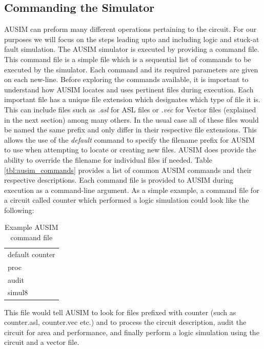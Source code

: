 \documentclass[12pt]{report}
\begin{document}
\subsection{Commanding the Simulator}
AUSIM can preform many different operations pertaining to the circuit.  For our purposes we will focus on the steps leading upto and including logic and stuck-at fault simulation.  The AUSIM simulator is executed by providing a command file.  This command file is a simple file which is a sequential list of commands to be executed by the simulator.  Each command and its required parameters are given on each new-line.  Before exploring the commands available, it is important to understand how AUSIM locates and uses pertinent files during execution.  Each important file has a unique file extension which designates which type of file it is.  This can include files such as \textit{.asl} for ASL files or \textit{.vec} for Vector files (explained in the next section) among many others.  In the usual case all of these files would be named the same prefix and only differ in their respective file extensions.  This allows the use of the \textit{default} command to specify the filename prefix for AUSIM to use when attempting to locate or creating new files.  AUSIM does provide the ability to override the filename for individual files if needed\cite{ausim}.  Table \ref{tbl:ausim_commands} provides a list of common AUSIM commands and their respective descriptions.  Each command file is provided to AUSIM during execution as a command-line argument.  As a simple example, a command file for a circuit called counter which performed a logic simulation could look like the following:
\begin{table}
	\caption{Example AUSIM command file}
	\begin{center}
		\begin{tabular}{l}
		default counter \\
		proc \\
		audit \\
		simul8 \\
		\end{tabular}
	\end{center}
\end{table}
This file would tell AUSIM to look for files prefixed with counter (such as counter.asl, counter.vec etc.) and to process the circuit description, audit the circuit for area and performance, and finally perform a logic simulation using the circuit and a vector file.
\end{document}

